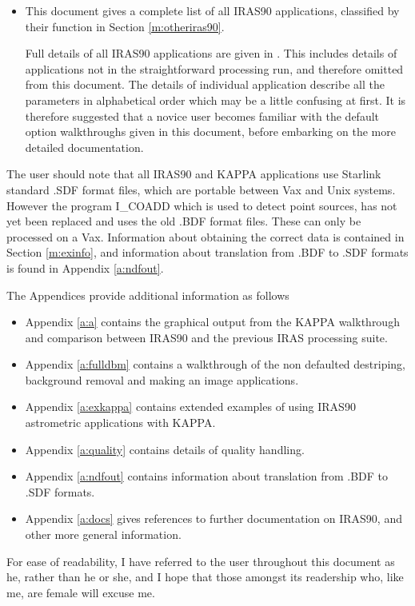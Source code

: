\begin{itemize}
\item This document gives a complete list of all IRAS90 applications, classified
by their function in Section \ref{m:otheriras90}. 

Full details of all IRAS90 applications are given in
. This includes
details of applications not in the straightforward processing run, and
therefore omitted from this document. The details of individual application
describe all the parameters in alphabetical order which may be a little
confusing at first. It is therefore suggested that a novice user becomes
familiar with the default option walkthroughs given in this document, before
embarking on the more detailed documentation.
\end{itemize}

The user should note that all IRAS90 and KAPPA applications use Starlink
standard .SDF format files, which are portable between Vax and Unix systems.
However the program I\_COADD which is used to detect point sources, has not
yet been replaced and uses the old .BDF format files. These can only be
processed on a Vax. Information about obtaining the correct data is contained
in Section \ref{m:exinfo}, and information about translation from .BDF to .SDF
formats is found in Appendix \ref{a:ndfout}.

The Appendices provide additional information as follows
\begin{itemize}
\item Appendix \ref{a:a} contains the graphical output from the KAPPA
walkthrough and comparison between IRAS90 and the previous IRAS processing
suite.
\item Appendix \ref{a:fulldbm} contains a walkthrough of the non defaulted
destriping, background removal and making an image applications.
\item Appendix \ref{a:exkappa} contains extended examples of using IRAS90
astrometric applications with KAPPA.
\item Appendix \ref{a:quality} contains details of quality handling.
\item Appendix \ref{a:ndfout} contains information about translation from
.BDF to .SDF formats.
\item Appendix \ref{a:docs} gives references to further documentation on IRAS90,
and other more general information.
\end{itemize}

For ease of readability, I have referred to the user throughout this document  
as he, rather than he or she, and I hope that those amongst its readership 
who, like me, are female will excuse me.

